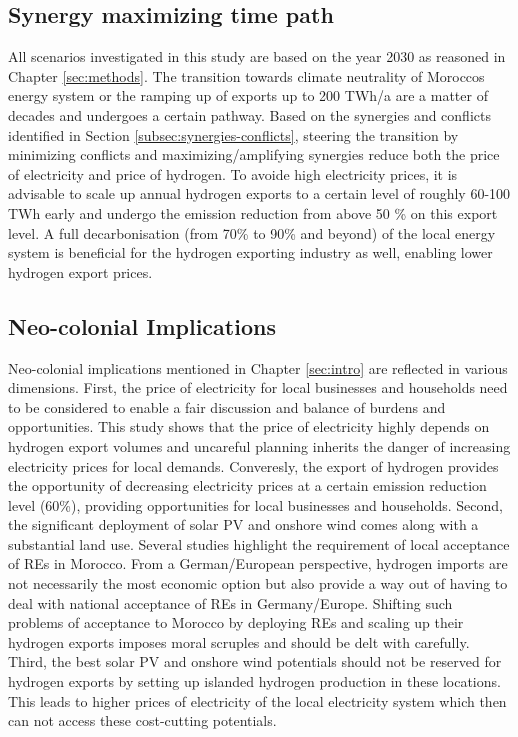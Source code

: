 \subsection{Synergy maximizing time path}
\label{subsec:timepath}
All scenarios investigated in this study are based on the year 2030 as reasoned in Chapter \ref{sec:methods}. The transition towards climate neutrality of Moroccos energy system or the ramping up of exports up to 200 TWh/a are a matter of decades and undergoes a certain pathway. Based on the synergies and conflicts identified in Section \ref{subsec:synergies-conflicts}, steering the transition by minimizing conflicts and maximizing/amplifying synergies reduce both the price of electricity and price of hydrogen. To avoide high electricity prices, it is advisable to scale up annual hydrogen exports to a certain level of roughly 60-100 TWh early and undergo the emission reduction from above 50 \% on this export level. A full decarbonisation (from 70\% to 90\% and beyond) of the local energy system is beneficial for the hydrogen exporting industry as well, enabling lower hydrogen export prices.


\subsection{Neo-colonial Implications}
\label{subsec:neocolonial}
Neo-colonial implications mentioned in Chapter \ref{sec:intro} are reflected in various dimensions. First, the price of electricity for local businesses and households need to be considered to enable a fair discussion and balance of burdens and opportunities. This study shows that the price of electricity highly depends on hydrogen export volumes and uncareful planning inherits the danger of increasing electricity prices for local demands. Converesly, the export of hydrogen provides the opportunity of decreasing electricity prices at a certain emission reduction level (60\%), providing opportunities for local businesses and households.
Second, the significant deployment of solar PV and onshore wind comes along with a substantial land use. Several studies \cite{Terrapon-Pfaff2019, Hanger2016} highlight the requirement of local acceptance of REs in Morocco. From a German/European perspective, hydrogen imports are not necessarily the most economic option but also provide a way out of having to deal with national acceptance of REs in Germany/Europe. Shifting such problems of acceptance to Morocco by deploying REs and scaling up their hydrogen exports imposes moral scruples and should be delt with carefully. %
Third, the best solar PV and onshore wind potentials should not be reserved for hydrogen exports by setting up islanded hydrogen production in these locations. This leads to higher prices of electricity of the local electricity system which then can not access these cost-cutting potentials.

